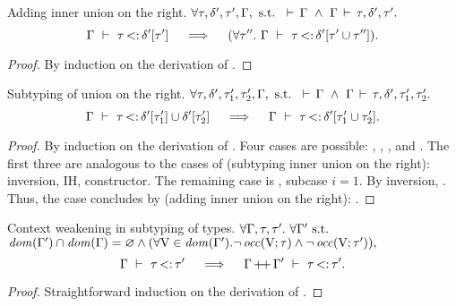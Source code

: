\begin{lemma}{Adding inner union on the right.}%
\label{lem:add-inner-union-right}
    $\forall \tau, \delta', \tau', \Gamma, \text{ s.t. }
    \,\vdash\,\Gamma\ \land\ \Gamma\,\vdash\,\tau, \delta', \tau'.$
    \[
        \subtydflt{\ty}{\plug{\dctx'}{\ty'}}
        \quad\implies\quad
        (\forall \ty''.\ \subtydflt{\ty}{\plug{\dctx'}{\tyunion{\ty'}{\ty''}}}).
    \]
\end{lemma}
\begin{proof}
    By induction on the derivation of
    .
\end{proof}

\begin{lemma}{Subtyping of union on the right.}%
\label{lem:sub-union-right}
    $\forall \tau, \delta', \tau'_1, \tau'_2, \Gamma, \text{ s.t. }
    \,\vdash\,\Gamma\ \land\ \Gamma\,\vdash\,\tau, \delta', \tau'_1, \tau'_2.$
    \[
        \Gamma\ \vdash\ \tau \operatorname{<:} \delta'[\tau'_1] \cup \delta'[\tau'_2]
        \quad\implies\quad
        \Gamma\ \vdash\ \tau \operatorname{<:} \delta'[\tau'_1 \cup \tau'_2].
    \]
\end{lemma}
\begin{proof}
    By induction on the derivation of
    .
    Four cases are possible: , , , and
    . The first three are analogous to the cases of
     (subtyping inner union on the right): 
    inversion, IH, constructor.
    The remaining case is , subcase $i=1$.
    By inversion, .
    Thus, the case concludes by  (adding inner
    union on the right):
    .
\end{proof}

\begin{lemma}{Context weakening in subtyping of types.}%
\label{lem:subty-weakening}
    $\forall \Gamma, \tau, \tau'.\ \forall \Gamma' \text{ s.t. }$\\
    $\operatorname{\mathit{dom}}(\Gamma') \cap \operatorname{\mathit{dom}}(\Gamma) = \varnothing \land 
    (\forall \mathrm{V} \in \operatorname{\mathit{dom}}(\Gamma'). 
        \lnot \operatorname{\mathit{occ}}(\mathrm{V};\tau) \land \lnot \operatorname{\mathit{occ}}(\mathrm{V};\tau')),$
    \[ \Gamma\ \vdash\ \tau \operatorname{<:} \tau' \quad\implies\quad 
    \Gamma\operatorname{+\!+}\Gamma'\ \vdash\ \tau \operatorname{<:} \tau'. \]
\end{lemma}
\begin{proof}
    Straightforward induction on the derivation of .
\end{proof}


